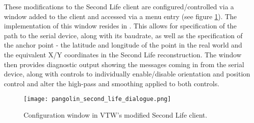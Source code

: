 These modifications to the Second Life client are configured/controlled via a window added to the client and accessed via a menu entry (see figure \ref{pangolin_second_life_dialogue.png}). The implementation of this window resides in . This allows for specification of the path to the serial device, along with its baudrate, as well as the specification of the anchor point - the latitude and longitude of the point in the real world and the equivalent X/Y coordinates in the Second Life reconstruction. The window then provides diagnostic output showing the messages coming in from the serial device, along with controls to individually enable/disable orientation and position control and alter the high-pass and smoothing applied to both controls.

\begin{figure}[h]
\centering
  \texttt{[image: pangolin\_second\_life\_dialogue.png]}
  \caption{Configuration window in VTW's modified Second Life client.}
  \label{pangolin_second_life_dialogue.png}
\end{figure}

